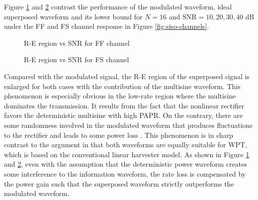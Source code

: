 Figure \ref{fig:siso-ff-snr} and \ref{fig:siso-fs-snr} contrast the performance of the modulated waveform, ideal superposed waveform and its lower bound for $N = 16$ and ${\text{SNR}} = 10,20,30,40$ dB under the FF and FS channel response in Figure \ref{fig:siso-channels}.

\begin{figure}[ht]
  \centering
  \quad
  \caption{R-E region vs SNR for FF channel}\label{fig:siso-ff-snr}
\end{figure}

\begin{figure}[ht]
  \centering
  \quad
  \caption{R-E region vs SNR for FS channel}\label{fig:siso-fs-snr}
\end{figure}

Compared with the modulated signal, the R-E region of the superposed signal is enlarged for both cases with the contribution of the multisine waveform. This phenomenon is especially obvious in the low-rate region where the multisine dominates the transmission. It results from the fact that the nonlinear rectifier favors the deterministic multisine with high PAPR. On the contrary, there are some randomness involved in the modulated waveform that produces fluctuations to the rectifier and leads to some power loss \cite{Clerckx2018}. This phenomenon is in sharp contrast to the argument in \cite{Xu2014} that both waveforms are equally suitable for WPT, which is based on the conventional linear harvester model. As shown in Figure \ref{fig:siso-ff-snr} and \ref{fig:siso-fs-snr}, even with the assumption that the deterministic power waveform creates some interference to the information waveform, the rate loss is compensated by the power gain such that the superposed waveform strictly outperforms the modulated waveform.

